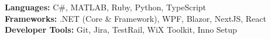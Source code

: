 \textbf{Languages:} C\#, MATLAB, Ruby, Python, TypeScript\\
\textbf{Frameworks:} .NET (Core \& Framework), WPF, Blazor, NextJS, React \\
\textbf{Developer Tools:} Git, Jira, TestRail, WiX Toolkit, Inno Setup 